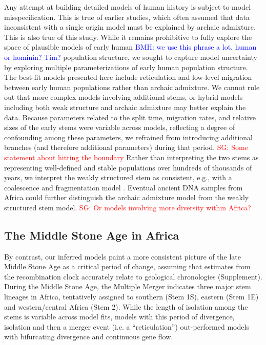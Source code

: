 \documentclass[]{article}
\newcommand{\sgcomment}[1]{{\textcolor{red}{SG: #1}}}
\newcommand{\bmhcomment}[1]{{\textcolor{blue}{BMH: #1}}}
\begin{document}
Any attempt at building detailed models of human history is subject to model
misspecification. This is true of earlier studies, which often assumed that
data inconsistent with a single origin model must be explained by archaic
admixture. This is also true of this study. While it remains prohibitive to
fully explore the space of plausible models of early human \bmhcomment{we use
this phrase a lot. human or hominin? Tim?} population structure, we sought to
capture model uncertainty by exploring multiple parameterizations of early
human population structure. The best-fit models presented here include
reticulation and low-level migration between early human populations rather
than archaic admixture. We cannot rule out that more complex models involving
additional stems, or hybrid models including both weak structure and archaic
admixture may better explain the data. Because parameters related to the split
time, migration rates, and relative sizes of the early stems were variable
across models, reflecting a degree of confounding among these parameters, we
refrained from introducing additional branches (and therefore additional
parameters) during that period. \sgcomment{Some statement about hitting the
boundary} Rather than interpreting the two stems as representing well-defined
and stable populations over hundreds of thousands of years, we interpret the
weakly structured stem as consistent, e.g., with a coalescence and
fragmentation model \citep{Scerri2019-xg}.  Eventual ancient DNA samples from
Africa could further distinguish the archaic admixture model from the weakly
structured stem model. \sgcomment{Or models involving more diversity within
Africa?}

\subsection*{The Middle Stone Age in Africa}

By contrast, our inferred models paint a more consistent picture of the late
Middle Stone Age as a critical period of change, assuming that estimates from
the recombination clock accurately relate to geological chronologies
(Supplement). During the Middle Stone Age, the Multiple Merger indicates three
major stem lineages in Africa, tentatively assigned to southern (Stem 1S),
eastern (Stem 1E) and western/central Africa (Stem 2). While the length of
isolation among the stems is variable across model fits, models with this
period of divergence, isolation and then a merger event (i.e. a “reticulation”)
out-performed models with bifurcating divergence and continuous gene flow. 
\end{document}
